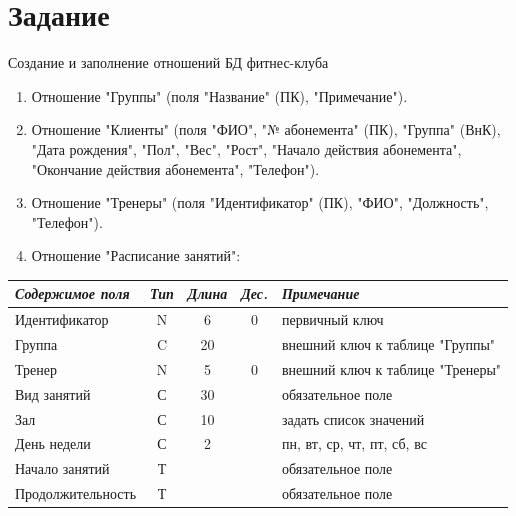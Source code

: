 \documentclass[a4paper,14pt]{article}
\begin{document}

\tableofcontents
\pagebreak

\section{Задание}

Создание и заполнение отношений БД фитнес-клуба

\begin{enumerate}
	\item Отношение "Группы" (поля "Название" (ПК), "Примечание").
	\item	Отношение "Клиенты" (поля "ФИО", "№ абонемента" (ПК), "Группа" (ВнК), "Дата рождения", "Пол", "Вес", "Рост", "Начало действия абонемента", "Окончание действия абонемента", "Телефон").
	\item	Отношение "Тренеры" (поля "Идентификатор" (ПК), "ФИО", "Должность", "Телефон").
	\item	Отношение "Расписание занятий":
\end{enumerate}
	\begin{table}[!h]
	\begin{center}
		\begin{flushleft}
		\end{flushleft}

		\begin{tabular}{|l|c|c|c|l|}
			\hline
			\textit{Содержимое поля} & \textit{Тип} & \textit{Длина} & \textit{Дес.} & \textit{Примечание}              \\ \hline
			Идентификатор            & N            & 6              & 0             & первичный ключ                   \\ \hline
			Группа                   & C            & 20             &               & внешний ключ к таблице "Группы"  \\ \hline
			Тренер                   & N            & 5              & 0             & внешний ключ к таблице "Тренеры" \\ \hline
			Вид занятий              & С            & 30             &               & обязательное поле                \\ \hline
			Зал                      & С            & 10             &               & задать список значений           \\ \hline
			День недели              & С            & 2              &               & пн, вт, ср, чт, пт, сб, вс       \\ \hline
			Начало занятий           & Т            &                &               & обязательное поле                \\ \hline
			Продолжительность        & Т            &                &               & обязательное поле                \\ \hline
		\end{tabular}
	\end{center}
\end{table}
\end{document}
